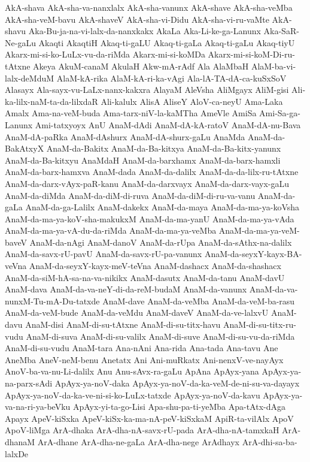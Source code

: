 {AkA-shava
AkA-sha-va-nanxlalx
AkA-sha-vanunx
AkA-shave
AkA-sha-veMba
AkA-sha-veM-bavu
AkA-shaveV
AkA-sha-vi-Didu
AkA-sha-vi-ru-vaMte
AkA-shavu
Aka-Bu-ja-na-vi-lalx-da-nanxkakx
AkaLa
Aka-Li-ke-ga-Lanunx
Aka-SaR-Ne-gaLu
Akaqti
AkaqtiH
Akaq-ti-gaLU
Akaq-ti-gaLa
Akaq-ti-gaLu
Akaq-tiyU
Akarx-mi-si-ko-LuLx-vu-da-riMda
Akarx-mi-si-koMDa
Akarx-mi-si-koM-Di-ru-tAtxne
Akeya
AkuM-canaM
AkulaH
Akw-mA-rAdf
Ala
AlaMbaH
AlaM-ba-vi-lalx-deMduM
AlaM-kA-rika
AlaM-kA-ri-ka-vAgi
Ala-lA-TA-dA-ca-kuSxSoV
Alasayx
Ala-sayx-vu-LaLx-nanx-kakxra
AlayaM
AleVsha
AliMgayx
AliM-gisi
Ali-ka-lilx-naM-ta-da-lilxdaR
Ali-kalulx
AlisA
AliseY
AloV-ca-neyU
Ama-Laka
Amalx
Ama-na-veM-buda
Ama-tarx-niV-la-kaMTha
AmeVle
AmiSa
Ami-Sa-ga-Lanunx
Ami-tatxyoyx
AnU
AnaM-dAdi
AnaM-dA-kA-ratoV
AnaM-dA-nu-Bava
AnaM-dA-paRka
AnaM-dAshurx
AnaM-dA-shurx-gaLu
AnaMda
AnaM-da-BakAtxyX
AnaM-da-Bakitx
AnaM-da-Ba-kitxya
AnaM-da-Ba-kitx-yanunx
AnaM-da-Ba-kitxyu
AnaMdaH
AnaM-da-barxhamx
AnaM-da-barx-hamxli
AnaM-da-barx-hamxva
AnaM-dada
AnaM-da-dalilx
AnaM-da-da-lilx-ru-tAtxne
AnaM-da-darx-vAyx-paR-kanu
AnaM-da-darxvayx
AnaM-da-darx-vayx-gaLu
AnaM-da-diMda
AnaM-da-diM-di-ruva
AnaM-da-diM-di-ru-va-vanu
AnaM-da-gaLa
AnaM-da-ga-Lalilx
AnaM-dakekx
AnaM-da-maya
AnaM-da-ma-ya-koVsha
AnaM-da-ma-ya-koV-sha-makukxM
AnaM-da-ma-yanU
AnaM-da-ma-ya-vAda
AnaM-da-ma-ya-vA-du-da-riMda
AnaM-da-ma-ya-veMba
AnaM-da-ma-ya-veM-baveV
AnaM-da-nAgi
AnaM-danoV
AnaM-da-rUpa
AnaM-da-sAthx-na-dalilx
AnaM-da-savx-rU-pavU
AnaM-da-savx-rU-pa-vanunx
AnaM-da-seyxY-kayx-BA-veVna
AnaM-da-seyxY-kayx-meV-teVna
AnaM-dashacx
AnaM-da-shashacx
AnaM-da-siM-hA-sa-na-va-nikikx
AnaM-dasutx
AnaM-da-tanu
AnaM-davU
AnaM-dava
AnaM-da-va-neY-di-da-reM-budaM
AnaM-da-vanunx
AnaM-da-va-nunxM-Tu-mA-Du-tatxde
AnaM-dave
AnaM-da-veMba
AnaM-da-veM-ba-rasu
AnaM-da-veM-bude
AnaM-da-veMdu
AnaM-daveV
AnaM-da-ve-lalxvU
AnaM-davu
AnaM-disi
AnaM-di-su-tAtxne
AnaM-di-su-titx-havu
AnaM-di-su-titx-ru-vudu
AnaM-di-suva
AnaM-di-su-valilx
AnaM-di-suve
AnaM-di-su-vu-da-riMda
AnaM-di-su-vudu
AnaM-tara
Ana-nAni
Ana-rida
Ana-tada
Ana-tavu
Ane
AneMba
AneV-neM-benu
Anetatx
Ani
Ani-muRkatx
Ani-nenxV-ve-nayAyx
AnoV-ba-va-nu-Li-dalilx
Anu
Anu-sAvx-ra-gaLu
ApAna
ApAyx-yana
ApAyx-ya-na-parx-sAdi
ApAyx-ya-noV-daka
ApAyx-ya-noV-da-ka-veM-de-ni-su-va-dayayx
ApAyx-ya-noV-da-ka-ve-ni-si-ko-LuLx-tatxde
ApAyx-ya-noV-da-kavu
ApAyx-ya-va-na-ri-ya-beVku
ApAyx-yi-ta-go-Lisi
Apa-shu-pa-ti-yeMba
Apa-tAtx-dAga
Apayx
ApeV-kiSxka
ApeV-kiSx-ka-ma-nA-peV-kiSxkaM
ApiR-ta-vilAlx
ApoV
ApoV-liMga
ArA-dhaka
ArA-dha-nA-savx-rU-pada
ArA-dha-nA-tamxkaH
ArA-dhanaM
ArA-dhane
ArA-dha-ne-gaLa
ArA-dha-nege
ArAdhayx
ArA-dhi-sa-ba-lalxDe
}
